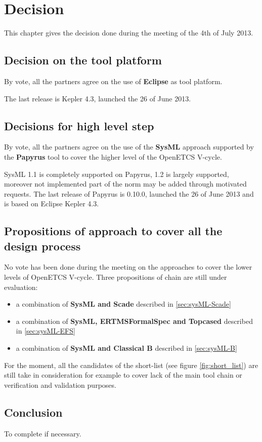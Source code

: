 \chapter{Decision}
\label{sec:decision}

This chapter gives the decision done during the meeting of the 4th of July 2013.


\section{Decision on the tool platform}

By vote, all the partners agree on the use of \textbf{Eclipse} as tool platform.

The last release is Kepler 4.3, launched the 26 of June 2013.


\section{Decisions for high level step}

By vote, all the partners agree on the use of the \textbf{SysML} approach supported by the \textbf{Papyrus} tool to cover the higher level of the  OpenETCS V-cycle.

SysML 1.1 is completely supported on Papyrus, 1.2 is largely supported, moreover not implemented part of the norm may be added through motivated requests.
The last release of Papyrus is 0.10.0, launched the 26 of June 2013 and is based on Eclipse Kepler 4.3.

\section{Propositions of approach to cover all the design process}

No vote has been done during the meeting on the approaches to cover the lower  levels of OpenETCS V-cycle.
Three propositions of chain are still under evaluation:

\begin{itemize}
\item a combination of \textbf{SysML  and Scade} described in \ref{sec:sysML-Scade}
\item a combination of \textbf{SysML, ERTMSFormalSpec and Topcased} described in \ref{sec:sysML-EFS}
\item a combination of \textbf{SysML  and Classical B} described in \ref{sec:sysML-B}
\end{itemize}

For the moment, all the candidates of the short-list (see figure \ref{fig:short_list}) are still take in consideration for example to  cover lack  of the main tool chain or verification and validation purposes.

\section{Conclusion}


\begin{todo_comment}
To  complete if necessary.
\end{todo_comment}

